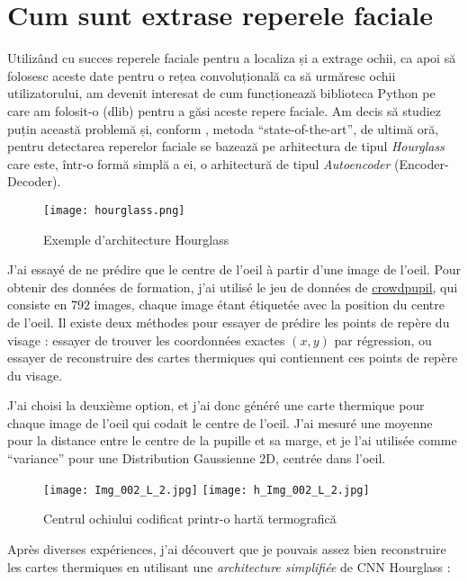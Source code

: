 
\section{Cum sunt extrase reperele faciale}
Utilizând cu succes reperele faciale pentru a localiza și a extrage ochii, ca apoi să folosesc aceste date pentru o rețea convoluțională ca să urmăresc ochii utilizatorului, am devenit interesat de cum funcționează biblioteca Python pe care am folosit-o (dlib) pentru a găsi aceste repere faciale.
Am decis să studiez puțin această problemă și, conform \cite{paper_stacked_hourglass}, metoda ``state-of-the-art'', de ultimă oră, pentru detectarea reperelor faciale se bazează pe arhitectura de tipul \emph{Hourglass} care este, într-o formă simplă a ei, o arhitectură de tipul \emph{Autoencoder} (Encoder-Decoder).


\begin{figure}[h]
    \centering
    \texttt{[image: hourglass.png]}
    \caption{Exemple d'architecture Hourglass}
\end{figure}


J'ai essayé de ne prédire que le centre de l'oeil à partir d'une image de l'oeil.
Pour obtenir des données de formation, j'ai utilisé le jeu de données de \href{http://cs.uef.fi/pupoint/}{crowdpupil}, qui consiste en $792$ images, chaque image étant étiquetée avec la position du centre de l'oeil.
Il existe deux méthodes pour essayer de prédire les points de repère du visage : essayer de trouver les coordonnées exactes $(x, y)$ par régression, ou essayer de reconstruire des cartes thermiques qui contiennent ces points de repère du visage.


J'ai choisi la deuxième option, et j'ai donc généré une carte thermique pour chaque image de l'oeil qui codait le centre de l'oeil.
J'ai mesuré une moyenne pour la distance entre le centre de la pupille et sa marge, et je l'ai utilisée comme ``variance'' pour une Distribution Gaussienne 2D, centrée dans l'oeil.

\begin{figure}[h]
    \centering
    \texttt{[image: Img\_002\_L\_2.jpg]}
    \texttt{[image: h\_Img\_002\_L\_2.jpg]}
    \caption{Centrul ochiului codificat printr-o hartă termografică}
\end{figure}

\clearpage


Après diverses expériences, j'ai découvert que je pouvais assez bien reconstruire les cartes thermiques en utilisant une \emph{architecture simplifiée} de CNN Hourglass :


